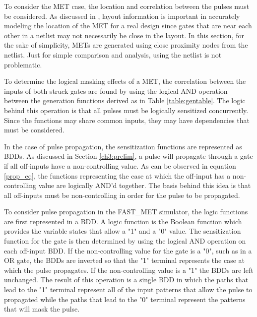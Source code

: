 To consider the MET case, the location and correlation between the pulses must be considered. As discussed in \cite{Ebrahimi2016}, layout information is important in accurately modeling the location of the MET for a real design since gates that are near each other in a netlist may not necessarily be close in the layout. In this section, for the sake of simplicity, METs are generated using close proximity nodes from the netlist. Just for simple comparison and analysis, using the netlist is not problematic. 

To determine the logical masking effects of a MET, the correlation between the inputs of both struck gates are found by using the logical AND operation between the generation functions derived as in Table \ref{table:gentable}. The logic behind this operation is that all pulses must be logically sensitized concurrently. Since the functions may share common inputs, they may have dependencies that must be considered. 

In the case of pulse propagation, the sensitization functions are represented as BDDs. As discussed in Section \ref{ch3:prelim}, a pulse will propagate through a gate if all off-inputs have a non-controlling value. As can be observed in equation \ref{prop_eq}, the functions representing the case at which the off-input has a non-controlling value are logically AND'd together. The basis behind this idea is that all off-inputs must be non-controlling in order for the pulse to be propagated. 

To consider pulse propagation in the FAST\_MET simulator, the logic functions are first represented in a BDD. A logic function is the Boolean function which provides the variable states that allow a "1" and a "0" value. The sensitization function for the gate is then determined by using the logical AND operation on each off-input BDD. If the non-controlling value for the gate is a "0", such as in a OR gate, the BDDs are inverted so that the "1" terminal represents the case at which the pulse propagates. If the non-controlling value is a "1" the BDDs are left unchanged. The result of this operation is a single BDD in which the paths that lead to the "1" terminal represent all of the input patterns that allow the pulse to propagated while the paths that lead to the "0" terminal represent the patterns that will mask the pulse.

